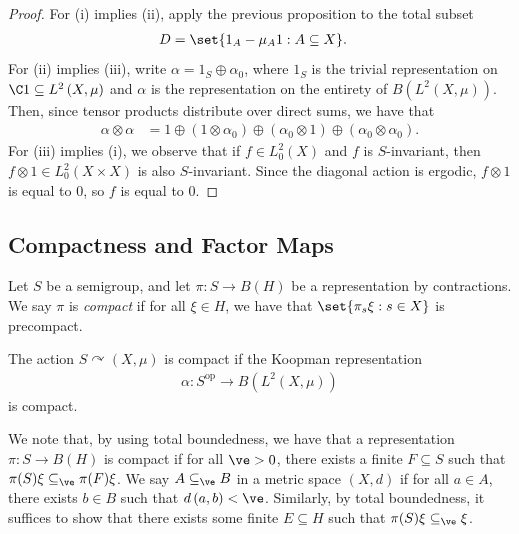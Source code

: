\documentclass[10pt]{mypackage}
\begin{document}
\begin{proof}
  For (i) implies (ii), apply the previous proposition to the total subset
  \begin{align*}
    D &= \set{1_A - \mu_A 1 : A\subseteq X}.
  \end{align*}
  For (ii) implies (iii), write $\alpha = 1_S\oplus \alpha_0$, where $1_S$ is the trivial representation on $\C1\subseteq L^2\left( X,\mu \right)$ and $\alpha$ is the representation on the entirety of $B\left( L^2\left( X,\mu \right) \right)$. Then, since tensor products distribute over direct sums, we have that
  \begin{align*}
    \alpha\otimes\alpha &= 1\oplus \left( 1\otimes \alpha_0 \right)\oplus \left( \alpha_0\otimes 1 \right)\oplus \left( \alpha_0\otimes\alpha_0 \right).
  \end{align*}
  For (iii) implies (i), we observe that if $f\in L^2_0\left( X \right)$ and $f$ is $S$-invariant, then $f\otimes 1\in L^2_0\left( X\times X \right)$ is also $S$-invariant. Since the diagonal action is ergodic, $f\otimes 1$ is equal to $0$, so $f$ is equal to $0$.
\end{proof}
\subsection{Compactness and Factor Maps}%
\begin{definition}
  Let $S$ be a semigroup, and let $\pi\colon S\to B\left( H \right)$ be a representation by contractions. We say $\pi$ is \textit{compact} if for all $\xi\in H$, we have that $\set{\pi_s\xi : s\in X}$ is precompact.

  The action $S\curvearrowright \left( X,\mu \right)$ is compact if the Koopman representation
  \begin{align*}
    \alpha\colon S^{\operatorname{op}} \to B\left( L^2\left( X,\mu \right) \right)
  \end{align*}
  is compact.
\end{definition}
We note that, by using total boundedness, we have that a representation $\pi\colon S\to B(H)$ is compact if for all $\ve > 0$, there exists a finite $F\subseteq S$ such that $\pi(S)\xi\subseteq_{\ve} \pi(F)\xi$. We say $A\subseteq_{\ve}B$ in a metric space $\left( X,d \right)$ if for all $a\in A$, there exists $b\in B$ such that $d\left( a,b \right) < \ve$. Similarly, by total boundedness, it suffices to show that there exists some finite $E\subseteq H$ such that $\pi(S)\xi \subseteq_{\ve}\xi$.
\end{document}
